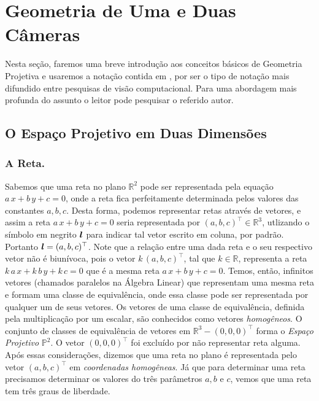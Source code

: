 \section{Geometria de Uma e Duas Câmeras}
Nesta seção, faremos uma breve introdução aos conceitos básicos de Geometria Projetiva e usaremos a notação contida em \cite{Hartley2004}, por ser o tipo de notação mais difundido entre pesquisas de visão computacional. Para uma abordagem mais profunda do assunto o leitor pode pesquisar o referido autor.  

\subsection{O Espaço Projetivo em Duas Dimensões}\label{sec.espaco-P2}


\subsubsection{A Reta.}\label{sec.reta}


Sabemos que uma reta no plano $\mathbb{R}^{2}$ pode ser representada pela equação $a\,x+b\,y+c=0$, onde a reta fica perfeitamente determinada pelos valores das constantes $a,b,c$. Desta forma, podemos representar retas através de vetores, e assim a reta $a\,x+b\,y+c=0$ seria representada por $(a,b,c)^\top \in \mathbb{R}^{3}$, utlizando o símbolo em negrito $\boldsymbol{l}$ para indicar tal vetor escrito em coluna, por padrão. Portanto $\boldsymbol{l} = (a,b,c)^\top$. Note que a relação entre uma dada reta e o seu respectivo vetor não é biunívoca, pois o vetor $k\,(a,b,c)^\top$, tal que $k \in \mathbb{R}$, representa a reta $k\,a\,x+k\,b\,y+k\,c=0$ que é a mesma reta $a\,x+b\,y+c=0$. Temos, então, infinitos vetores (chamados paralelos na Álgebra Linear) que representam uma mesma reta e formam uma classe de equivalência, onde essa classe pode ser representada por qualquer um de seus vetores. Os vetores de uma classe de equivalência, definida pela multiplicação por um escalar, são conhecidos como vetores {\it homogêneos}. O conjunto de classes de equivalência de vetores em $\mathbb{R}^{3} - (0,0,0)^\top$ forma o {\it Espaço Projetivo} $\mathbb{P}^{2}$. O vetor $(0,0,0)^\top$ foi excluído por não representar reta alguma. Após essas considerações, dizemos que uma reta no plano é representada pelo vetor $(a,b,c)^\top$ em {\it coordenadas homogêneas}. Já que para determinar uma reta precisamos determinar os valores do três parâmetros $a,b \,\,\text{e}\,\, c$, vemos que uma reta tem três graus de liberdade.\\

